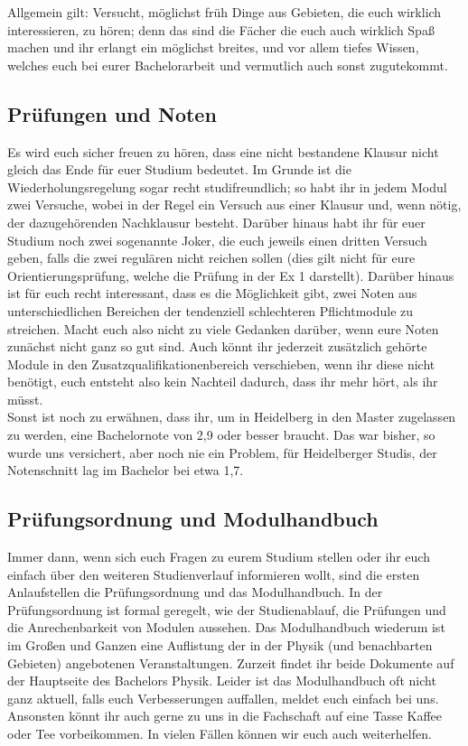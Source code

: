Allgemein gilt: Versucht, möglichst früh Dinge aus Gebieten, die euch wirklich interessieren, zu hören; denn das sind die Fächer die euch auch wirklich Spaß machen und ihr erlangt ein möglichst breites, und vor allem tiefes Wissen, welches euch bei eurer Bachelorarbeit und vermutlich auch sonst zugutekommt.

\subsection{Prüfungen und Noten}

Es wird euch sicher freuen zu hören, dass eine nicht bestandene Klausur nicht gleich das Ende für euer Studium bedeutet. Im Grunde ist die Wiederholungsregelung sogar recht studifreundlich; so habt ihr in jedem Modul zwei Versuche, wobei in der Regel ein Versuch aus einer Klausur und, wenn nötig, der dazugehörenden Nachklausur besteht. Darüber hinaus habt ihr für euer Studium noch zwei sogenannte Joker, die euch jeweils einen dritten Versuch geben, falls die zwei regulären nicht reichen sollen (dies gilt nicht für eure Orientierungsprüfung, welche die Prüfung in der Ex 1 darstellt). Darüber hinaus ist für euch recht interessant, dass es die Möglichkeit gibt, zwei Noten aus unterschiedlichen Bereichen der tendenziell schlechteren Pflichtmodule zu streichen. Macht euch also nicht zu viele Gedanken darüber, wenn eure Noten zunächst nicht ganz so gut sind. Auch könnt ihr jederzeit zusätzlich gehörte Module in den Zusatzqualifikationenbereich verschieben, wenn ihr diese nicht benötigt, euch entsteht also kein Nachteil dadurch, dass ihr mehr hört, als ihr müsst.\\

Sonst ist noch zu erwähnen, dass ihr, um in Heidelberg in den Master zugelassen zu werden, eine Bachelornote von 2,9 oder besser braucht. Das war bisher, so wurde uns versichert, aber noch nie ein Problem, für Heidelberger Studis, der Notenschnitt lag im Bachelor bei etwa 1,7. %

\subsection{Prüfungsordnung und Modulhandbuch}

Immer dann, wenn sich euch Fragen zu eurem Studium stellen oder ihr euch einfach über den weiteren Studienverlauf informieren wollt, sind die ersten Anlaufstellen die Prüfungsordnung und das Modulhandbuch. In der Prüfungsordnung ist formal geregelt, wie der Studienablauf, die Prüfungen und die Anrechenbarkeit von Modulen aussehen. Das Modulhandbuch wiederum ist im Großen und Ganzen eine Auflistung der in der Physik (und benachbarten Gebieten) angebotenen Veranstaltungen. Zurzeit findet ihr beide Dokumente auf der Hauptseite des Bachelors Physik. Leider ist das Modulhandbuch oft nicht ganz aktuell, falls euch Verbesserungen auffallen, meldet euch einfach bei uns.\\

Ansonsten könnt ihr auch gerne zu uns in die Fachschaft auf eine Tasse Kaffee oder Tee vorbeikommen. In vielen Fällen können wir euch auch weiterhelfen.

\begin{figure}[b]
\end{figure}
